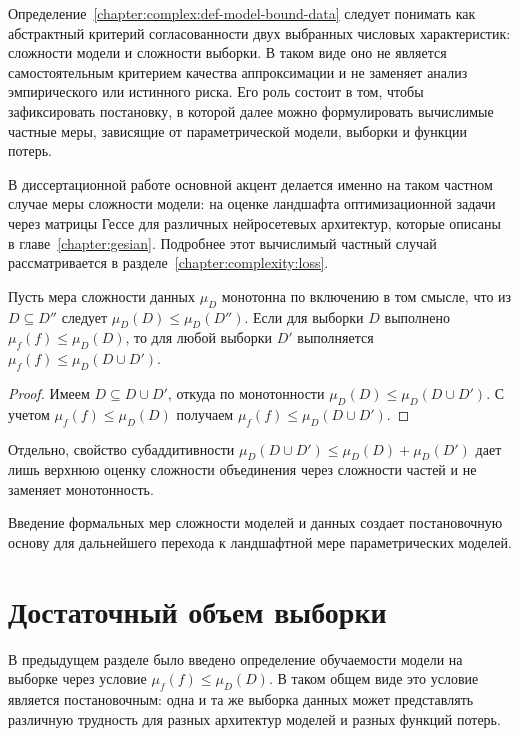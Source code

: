 Определение~\ref{chapter:complex:def-model-bound-data} следует понимать как абстрактный критерий согласованности двух выбранных числовых характеристик: сложности модели и сложности выборки. В таком виде оно не является самостоятельным критерием качества аппроксимации и не заменяет анализ эмпирического или истинного риска. Его роль состоит в том, чтобы зафиксировать постановку, в которой далее можно формулировать вычислимые частные меры, зависящие от параметрической модели, выборки и функции потерь.

В диссертационной работе основной акцент делается именно на таком частном случае меры сложности модели: на оценке ландшафта оптимизационной задачи через матрицы Гессе для различных нейросетевых архитектур, которые описаны в главе~\ref{chapter:gesian}. Подробнее этот вычислимый частный случай рассматривается в разделе~\ref{chapter:complexity:loss}.

\begin{proposition}\label{chapter:complex:theorem-finetunning}
    Пусть мера сложности данных $\mu_D$ монотонна по включению в том смысле, что из $D \subseteq D''$ следует $\mu_D(D) \leq \mu_D(D'')$.
    Если для выборки $D$ выполнено $\mu_f(f) \leq \mu_D(D)$, то для любой выборки $D'$ выполняется $\mu_f(f) \leq \mu_D(D \cup D')$.
\end{proposition}
\begin{proof}
    Имеем $D \subseteq D \cup D'$, откуда по монотонности $\mu_D(D) \leq \mu_D(D \cup D')$.
    С учетом $\mu_f(f) \leq \mu_D(D)$ получаем $\mu_f(f) \leq \mu_D(D \cup D')$.
\end{proof}

Отдельно, свойство субаддитивности $\mu_D(D\cup D')\leq \mu_D(D)+\mu_D(D')$ дает лишь верхнюю оценку сложности объединения через сложности частей и не заменяет монотонность.

Введение формальных мер сложности моделей и данных создает постановочную основу для дальнейшего перехода к ландшафтной мере параметрических моделей.

\section{Достаточный объем выборки}\label{chapter:complexity:sample-size}

В предыдущем разделе было введено определение обучаемости модели на выборке через условие $\mu_f(f) \leq \mu_D(D)$. В таком общем виде это условие является постановочным: одна и та же выборка данных может представлять различную трудность для разных архитектур моделей и разных функций потерь.

